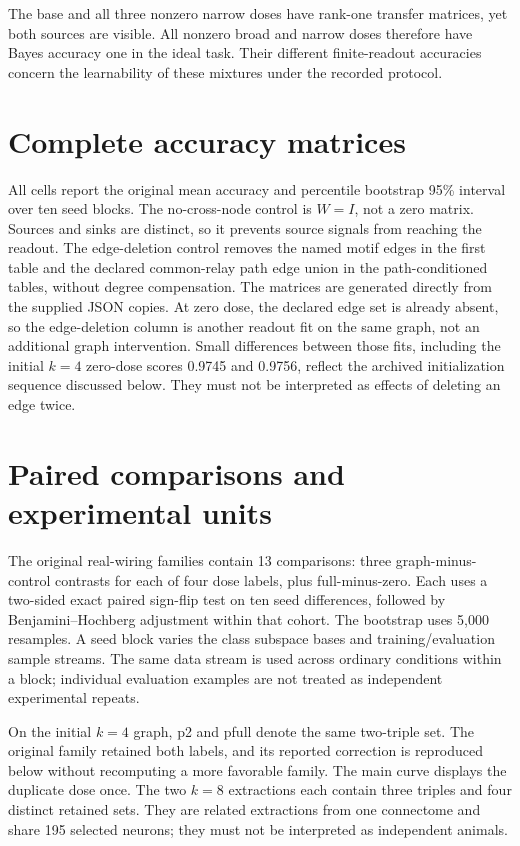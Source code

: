 \documentclass[10pt,letterpaper]{article}
\begin{document}
The base and all three nonzero narrow doses have rank-one transfer
matrices, yet both sources are visible. All nonzero broad and narrow
doses therefore have Bayes accuracy one in the ideal task. Their
different finite-readout accuracies concern the learnability of these
mixtures under the recorded protocol.

\section{Complete accuracy matrices}

All cells report the original mean accuracy and percentile bootstrap
95\% interval over ten seed blocks. The no-cross-node control is $W=I$,
not a zero matrix. Sources and sinks are distinct, so it prevents source
signals from reaching the readout. The edge-deletion control removes the
named motif edges in the first table and the declared common-relay path
edge union in the path-conditioned tables, without degree compensation.
The matrices are generated directly from the supplied JSON copies.
At zero dose, the declared edge set is already absent, so the edge-deletion
column is another readout fit on the same graph, not an additional graph
intervention. Small differences between those fits, including the initial
$k=4$ zero-dose scores 0.9745 and 0.9756, reflect the archived initialization
sequence discussed below. They must not be interpreted as effects of deleting
an edge twice.


\section{Paired comparisons and experimental units}

The original real-wiring families contain 13 comparisons: three
graph-minus-control contrasts for each of four dose labels, plus
full-minus-zero. Each uses a two-sided exact paired sign-flip test on ten
seed differences, followed by Benjamini--Hochberg adjustment within that
cohort. The bootstrap uses 5,000 resamples. A seed block varies the class
subspace bases and training/evaluation sample streams. The same data
stream is used across ordinary conditions within a block; individual
evaluation examples are not treated as independent experimental repeats.

On the initial $k=4$ graph, p2 and pfull denote the same two-triple set.
The original family retained both labels, and its reported correction is
reproduced below without recomputing a more favorable family. The main
curve displays the duplicate dose once. The two $k=8$ extractions each
contain three triples and four distinct retained sets. They are related
extractions from one connectome and share 195 selected neurons; they
must not be interpreted as independent animals.
\end{document}
